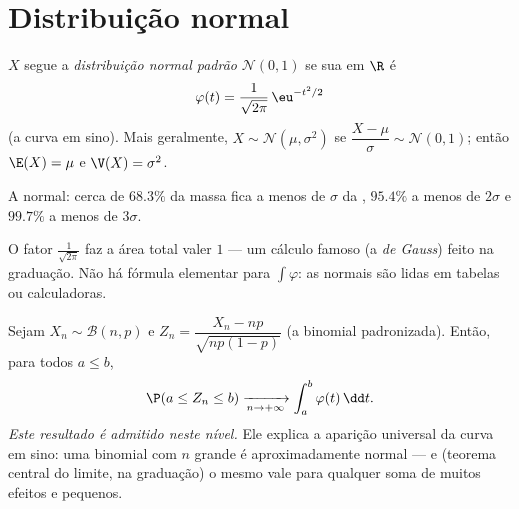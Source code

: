 \section{Distribuição normal}

\begin{definition}\label{def:g12:contdist:normal}
$X$ segue a \emph{distribuição normal padrão}
$\mathcal N(0, 1)$ se sua  em $\R$ é
\[
\varphi(t) = \frac{1}{\sqrt{2\pi}}\,\eu^{-t^2/2}
\]
(a curva em sino). Mais geralmente,
$X \sim \mathcal N(\mu, \sigma^2)$ se $\dfrac{X - \mu}{\sigma} \sim
\mathcal N(0,1)$; então $\E(X) = \mu$ e $\V(X) = \sigma^2$.
\end{definition}

\begin{omfigure}

{\small A  normal: cerca de $68.3\%$ da massa fica a menos de
$\sigma$ da , $95.4\%$ a menos de $2\sigma$ e $99.7\%$ a menos de
$3\sigma$.}
\end{omfigure}

\begin{remark}
O fator $\frac{1}{\sqrt{2\pi}}$ faz a área total valer $1$ --- um cálculo
famoso (a \emph{ de Gauss}) feito na graduação. Não há fórmula
elementar para $\int \varphi$: as  normais são lidas em
tabelas ou calculadoras.
\end{remark}

\begin{theorem}\label{thm:g12:contdist:tcl}
Sejam $X_n \sim \mathcal B(n, p)$ e
$Z_n = \dfrac{X_n - np}{\sqrt{np(1-p)}}$ (a binomial padronizada). Então,
para todos $a \leq b$,
\[
\P(a \leq Z_n \leq b) \xrightarrow[n\to+\infty]{}
\int_a^b \varphi(t)\,\dd t .
\]
\emph{Este resultado é admitido neste nível.} Ele explica a aparição
universal da curva em sino: uma binomial com $n$ grande é aproximadamente
normal --- e (teorema central do limite, na graduação) o mesmo vale para
qualquer soma de muitos efeitos  e pequenos.
\end{theorem}


